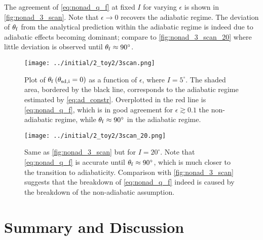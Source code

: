 \documentclass[
        fleqn,
        usenatbib,
        referee,
    ]{mnras}
\newcommand*{\p}[1]{\left(#1\right)}
\begin{document}
The agreement of \autoref{eq:nonad_q_f} at fixed $I$ for varying $\epsilon$ is
shown in \autoref{fig:nonad_3_scan}. Note that $\epsilon \to 0$ recovers the
adiabatic regime. The deviation of $\theta_{\rm f}$ from the analytical
prediction within the adiabatic regime is indeed due to adiabatic effects
becoming dominant; compare to \autoref{fig:nonad_3_scan_20} where little
deviation is observed until $\theta_{\rm f} \approx 90^\circ$.
\begin{figure}
    \centering
    \texttt{[image: ../initial/2\_toy2/3scan.png]}
    \caption{Plot of $\theta_{\rm  f}\p{\theta_{\rm sd, i} = 0}$ as a function
    of $\epsilon$, where $I = 5^\circ$. The shaded area, bordered by the black
    line, corresponds to the adiabatic regime estimated by
    \autoref{eq:ad_constr}. Overplotted in the red line is
    \autoref{eq:nonad_q_f}, which is in good agreement for $\epsilon \gtrsim
    0.1$ the non-adiabatic regime, while $\theta_{\rm f} \approx 90^\circ$ in
    the adiabatic regime.}\label{fig:nonad_3_scan}
\end{figure}
\begin{figure}
    \centering
    \texttt{[image: ../initial/2\_toy2/3scan\_20.png]}
    \caption{Same as \autoref{fig:nonad_3_scan} but for $I=20^\circ$. Note that
    \autoref{eq:nonad_q_f} is accurate until $\theta_{\rm f} \approx 90^\circ$,
    which is much closer to the transition to adiabaticity. Comparison with
    \autoref{fig:nonad_3_scan} suggests that the breakdown of
    \autoref{eq:nonad_q_f} indeed is caused by the breakdown of the
    non-adiabatic assumption.}\label{fig:nonad_3_scan_20}
\end{figure}

\section{Summary and Discussion}\label{s:disc}
\end{document}

